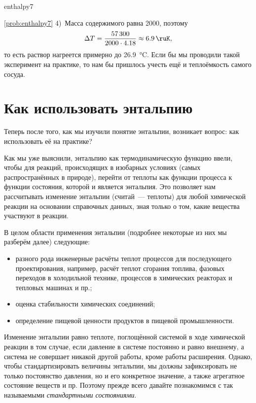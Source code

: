 \begin{problem}{}{enthalpy7}
\begin{sol}{\ref{prob:enthalpy7}}
        4)~Масса содержимого равна \qty{2000}{\ruG}, поэтому
        \begin{equation*}
            \Delta T = \frac{\num{57300}}{\num{2000} \cdot \num{4,18}} \approx \qty{6,9}{\ruK},
        \end{equation*}
        то есть раствор нагреется примерно до \qty{26,9}{\degreeCelsius}. Если бы мы проводили такой эксперимент на практике, то нам бы пришлось учесть ещё и теплоёмкость самого сосуда.
    \end{sol}
\end{problem}

\clearpage

\section{Как использовать энтальпию}

Теперь после того, как мы изучили понятие энтальпии, возникает вопрос: как использовать её на практике?

Как мы уже выяснили, энтальпию как термодинамическую функцию ввели, чтобы для реакций, происходящих в изобарных условиях (самых распространённых в природе), перейти от теплоты как функции процесса к функции состояния, которой и является энтальпия. Это позволяет нам рассчитывать изменение энтальпии (считай~--- теплоты) для любой химической реакции на основании справочных данных, зная только о том, какие вещества участвуют в реакции.

В целом области применения энтальпии (подробнее некоторые из них мы разберём далее) следующие:

\begin{itemize}
    \item разного рода инженерные расчёты теплот процессов для последующего проектирования, например, расчёт теплот сгорания топлива, фазовых переходов в холодильной технике, процессов в химических реакторах и тепловых машинах и пр.;
    \item оценка стабильности химических соединений;
    \item определение пищевой ценности продуктов в пищевой промышленности.
\end{itemize}

Изменение энтальпии равно теплоте, поглощённой системой в ходе химической реакции в том случае, если давление в системе постоянно и равно внешнему, а система не совершает никакой другой работы, кроме работы расширения. Однако, чтобы стандартизировать величины энтальпии, мы должны зафиксировать не только постоянство давления, но и его конкретное значение, а также агрегатное состояние веществ и пр. Поэтому прежде всего давайте познакомимся с так называемыми \emph{стандартными состояниями}.

